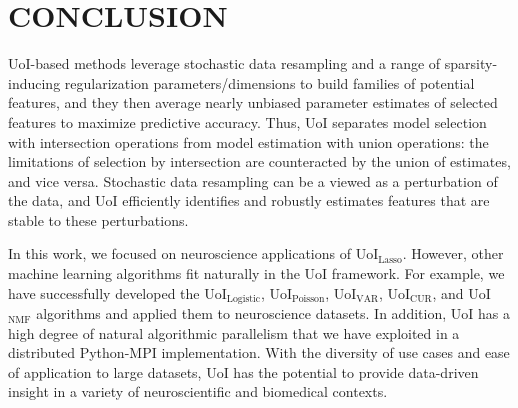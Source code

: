 \documentclass[letterpaper, 10 pt, conference]{ieeeconf}  %
\begin{document}
\section{CONCLUSION}

UoI-based methods leverage stochastic data resampling and a range of sparsity-inducing regularization parameters/dimensions to build families of potential features, and they then average nearly unbiased parameter estimates of selected features to maximize predictive accuracy. Thus, UoI separates model selection with intersection operations from model estimation with union operations: the limitations of selection by intersection are counteracted by the union of estimates, and vice versa. Stochastic data resampling can be a viewed as a perturbation of the data, and UoI efficiently identifies and robustly estimates features that are stable to these perturbations.

In this work, we focused on neuroscience applications of UoI$_{\text{Lasso}}$. However, other machine learning algorithms fit naturally in the UoI framework. For example, we have successfully developed  the UoI$_{\text{Logistic}}$, UoI$_{\text{Poisson}}$, UoI$_{\text{VAR}}$, UoI$_{\text{CUR}}$, and UoI$_{\text{NMF}}$ algorithms and applied them to neuroscience datasets. In addition, UoI has a high degree of natural algorithmic parallelism that we have exploited in a distributed Python-MPI implementation. With the diversity of use cases and ease of application to large datasets, UoI has the potential to provide data-driven insight in a variety of neuroscientific and biomedical contexts.

\addtolength{\textheight}{-12cm}   %







\end{document}
